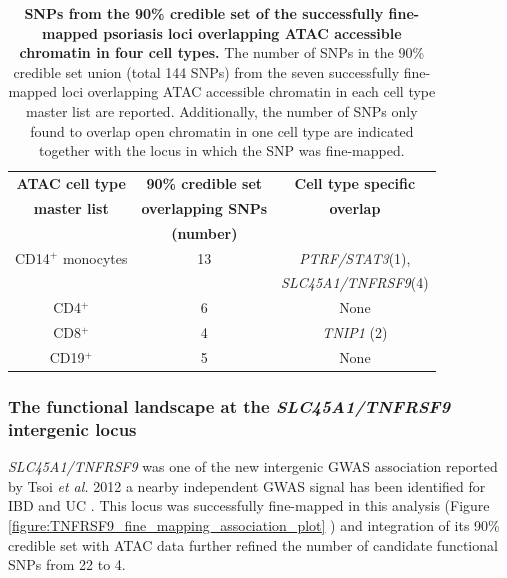 \begin{table}[htbp]
\centering
\begin{tabular}{@{} c c c}
\toprule
\textbf{ATAC cell type} & \textbf{90\% credible set}   &  \textbf{Cell type specific}  \\
\textbf{master list}    & \textbf{overlapping SNPs}    &   \textbf{overlap}   \\
									      &	\textbf{(number)}				     &                            \\
\midrule
\midrule
 CD14$^+$ monocytes    & 13                            &  \textit{PTRF/STAT3}(1),\\ 
                       &                               &  \textit{SLC45A1/TNFRSF9}(4)\\
 CD4$^+$              & 6                             &  None \\
 CD8$^+$              & 4                             &  \textit{TNIP1} (2)        \\
 CD19$^+$              & 5                            &  None     \\
\bottomrule
\end{tabular}
\medskip %
\caption[SNPs from the 90\% credible set of the successfully fine-mapped psoriasis loci overlapping ATAC accessible chromatin in four cell types.]{\textbf{SNPs from the 90\% credible set of the successfully fine-mapped psoriasis loci overlapping ATAC accessible chromatin in four cell types.} The number of SNPs in the 90\% credible set union (total 144 SNPs) from the seven successfully fine-mapped loci overlapping ATAC accessible chromatin in each cell type master list are reported. Additionally, the number of SNPs only found to overlap open chromatin in one cell type are indicated together with the locus in which the SNP was fine-mapped.}
\label{tab:Psoriasis_fine_mapping_ATAC_overlap}
\end{table}
 

\subsubsection{The functional landscape at the \textit{SLC45A1/TNFRSF9} intergenic locus}

\textit{SLC45A1/TNFRSF9} was one of the new intergenic GWAS association reported by Tsoi \textit{et al.} 2012 a nearby independent GWAS signal has been identified for IBD and UC \parencite{Jostins2012,Anderson2011}. This locus was successfully fine-mapped in this analysis (Figure \ref{figure:TNFRSF9_fine_mapping_association_plot} ) and integration of its 90\% credible set with ATAC data further refined the number of candidate functional SNPs from 22 to 4. 



